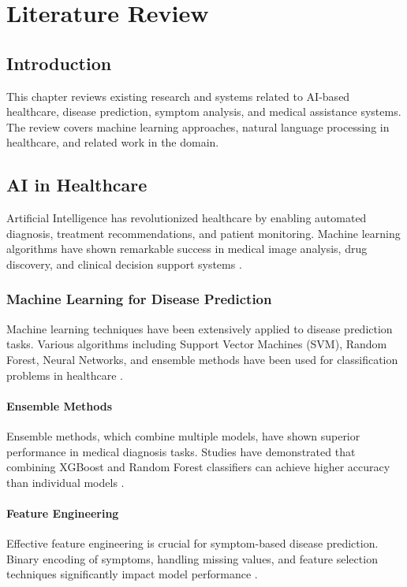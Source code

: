 \chapter{Literature Review}

\section{Introduction}
This chapter reviews existing research and systems related to AI-based healthcare, disease prediction, symptom analysis, and medical assistance systems. The review covers machine learning approaches, natural language processing in healthcare, and related work in the domain.

\section{AI in Healthcare}
Artificial Intelligence has revolutionized healthcare by enabling automated diagnosis, treatment recommendations, and patient monitoring. Machine learning algorithms have shown remarkable success in medical image analysis, drug discovery, and clinical decision support systems \cite{topol2019high}.

\subsection{Machine Learning for Disease Prediction}
Machine learning techniques have been extensively applied to disease prediction tasks. Various algorithms including Support Vector Machines (SVM), Random Forest, Neural Networks, and ensemble methods have been used for classification problems in healthcare \cite{rajkomar2018machine}.

\subsubsection{Ensemble Methods}
Ensemble methods, which combine multiple models, have shown superior performance in medical diagnosis tasks. Studies have demonstrated that combining XGBoost and Random Forest classifiers can achieve higher accuracy than individual models \cite{chen2016xgboost}.

\subsubsection{Feature Engineering}
Effective feature engineering is crucial for symptom-based disease prediction. Binary encoding of symptoms, handling missing values, and feature selection techniques significantly impact model performance \cite{guo2016calibration}.

